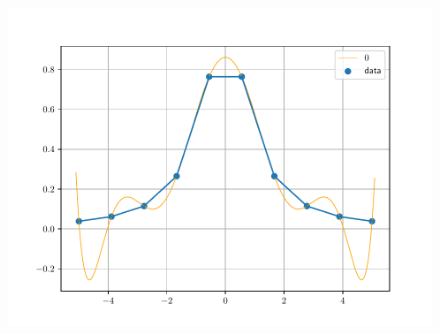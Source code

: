\begin{frame}
    \begin{solution}
        \begin{figure}[ht!]
            \centering
            \includegraphics[width=.7\paperwidth]{p12_lagrange10}
        \end{figure}
    \end{solution}
\end{frame}